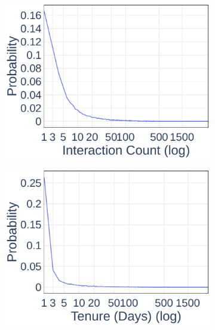 \begin{figure}[ht]
  \centering

	\begin{subfigure}[b]{0.3\textwidth}
    \includegraphics[width=\textwidth]{Figures/Data-Interaction-PDF}
  \end{subfigure}
	\begin{subfigure}[b]{0.3\textwidth}
    \includegraphics[width=\textwidth]{Figures/Data-Tenure-PDF}
  \end{subfigure}
	\begin{subfigure}[b]{0.3\textwidth}

\end{subfigure}
\end{figure}

